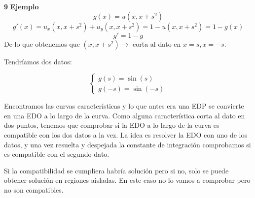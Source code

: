 \begin{example}{\bf 9}
		\textbf{Ejemplo}
		\[g(x) = u(x,x+s^2)\]
		\[g'(x) = u_x (x,x+s^2) + u_y(x,x+s^2) = 1 - u(x,x+s^2) = 1 - g(x)\]
		\[g' = 1-g\]
		De lo que obtenemos que $(x,x+s^2) \rightarrow $ corta al dato en $x=s, x=-s$.

		Tendríamos dos datos:

		\[
		\begin{cases}
		g(s) = \sin(s) \\
		g(-s) = \sin(-s)
		\end{cases}
		\]

		Encontramos las curvas características y lo que antes era una EDP se convierte en una EDO a lo largo de la curva. Como alguna característica corta al dato en dos puntos, tenemos que comprobar si la EDO a lo largo de la curva es compatible con los dos datos a la vez. La idea es resolver la EDO con uno de los datos, y una vez resuelta y despejada la constante de integración comprobamos si es compatible con el segundo dato.

		Si la compatibilidad se cumpliera habría solución pero si no, solo se puede obtener solución en regiones aisladas. En este caso no lo vamos a comprobar pero no son compatibles.

	\end{example}

